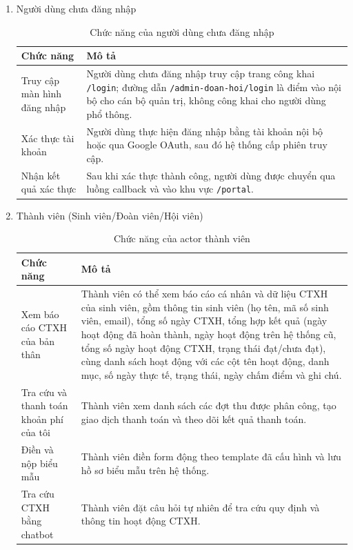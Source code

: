 \begin{enumerate}
    \renewcommand{\labelenumi}{\alph{enumi}.}
	\item Người dùng chưa đăng nhập
	\begin{table}[H]
	\centering
	\begin{tabular}{|p{5cm}|p{10cm}|}
		\hline
		Chức năng & Mô tả  \\
		\hline
		Truy cập màn hình đăng nhập & Người dùng chưa đăng nhập truy cập trang công khai \texttt{/login}; đường dẫn \texttt{/admin-doan-hoi/login} là điểm vào nội bộ cho cán bộ quản trị, không công khai cho người dùng phổ thông. \\
		\hline
		Xác thực tài khoản & Người dùng thực hiện đăng nhập bằng tài khoản nội bộ hoặc qua Google OAuth, sau đó hệ thống cấp phiên truy cập. \\
		\hline
		Nhận kết quả xác thực & Sau khi xác thực thành công, người dùng được chuyển qua luồng callback và vào khu vực \texttt{/portal}. \\
		\hline
	\end{tabular}
	\caption{Chức năng của người dùng chưa đăng nhập}
	\end{table}

	\item Thành viên (Sinh viên/Đoàn viên/Hội viên)
	\begin{table}[H]
	\centering
	\begin{tabular}{|p{5cm}|p{10cm}|}
		\hline
		Chức năng & Mô tả  \\
		\hline
		Xem báo cáo CTXH của bản thân & Thành viên có thể xem báo cáo cá nhân và dữ liệu CTXH của sinh viên, gồm thông tin sinh viên (họ tên, mã số sinh viên, email), tổng số ngày CTXH, tổng hợp kết quả (ngày hoạt động đã hoàn thành, ngày hoạt động trên hệ thống cũ, tổng số ngày hoạt động CTXH, trạng thái đạt/chưa đạt), cùng danh sách hoạt động với các cột tên hoạt động, danh mục, số ngày thực tế, trạng thái, ngày chấm điểm và ghi chú. \\
		\hline
		Tra cứu và thanh toán khoản phí của tôi & Thành viên xem danh sách các đợt thu được phân công, tạo giao dịch thanh toán và theo dõi kết quả thanh toán. \\
		\hline
		Điền và nộp biểu mẫu & Thành viên điền form động theo template đã cấu hình và lưu hồ sơ biểu mẫu trên hệ thống. \\
		\hline
		Tra cứu CTXH bằng chatbot & Thành viên đặt câu hỏi tự nhiên để tra cứu quy định và thông tin hoạt động CTXH. \\
		\hline
	\end{tabular}
	\caption{Chức năng của actor thành viên}
	\end{table}


\end{enumerate}
